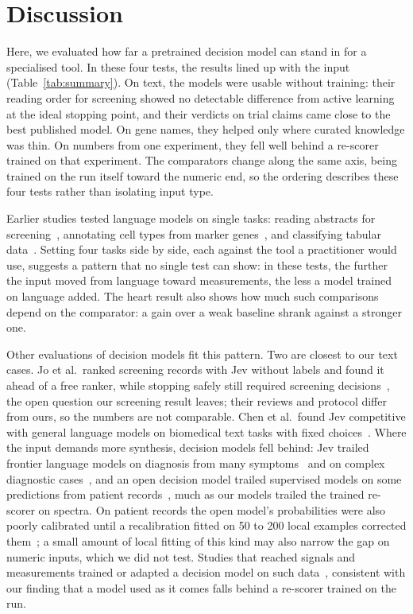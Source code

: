 \documentclass[10pt,twocolumn]{article}
\begin{document}
\section{Discussion}

Here, we evaluated how far a pretrained decision model can stand in for a specialised tool. In these four tests, the results lined up with the input (Table~\ref{tab:summary}). On text, the models were usable without training: their reading order for screening showed no detectable difference from active learning at the ideal stopping point, and their verdicts on trial claims came close to the best published model. On gene names, they helped only where curated knowledge was thin. On numbers from one experiment, they fell well behind a re-scorer trained on that experiment. The comparators change along the same axis, being trained on the run itself toward the numeric end, so the ordering describes these four tests rather than isolating input type.

Earlier studies tested language models on single tasks: reading abstracts for screening~\cite{guo2024}, annotating cell types from marker genes~\cite{gptcelltype}, and classifying tabular data~\cite{tabllm,hollmann}. Setting four tasks side by side, each against the tool a practitioner would use, suggests a pattern that no single test can show: in these tests, the further the input moved from language toward measurements, the less a model trained on language added. The heart result also shows how much such comparisons depend on the comparator: a gain over a weak baseline shrank against a stronger one.

Other evaluations of decision models fit this pattern. Two are closest to our text cases. Jo et al.\ ranked screening records with Jev without labels and found it ahead of a free ranker, while stopping safely still required screening decisions~\cite{jo2026}, the open question our screening result leaves; their reviews and protocol differ from ours, so the numbers are not comparable. Chen et al.\ found Jev competitive with general language models on biomedical text tasks with fixed choices~\cite{chen2026}. Where the input demands more synthesis, decision models fell behind: Jev trailed frontier language models on diagnosis from many symptoms~\cite{deobhakta2026} and on complex diagnostic cases~\cite{madrid2026}, and an open decision model trailed supervised models on some predictions from patient records~\cite{medjev}, much as our models trailed the trained re-scorer on spectra. On patient records the open model's probabilities were also poorly calibrated until a recalibration fitted on 50 to 200 local examples corrected them~\cite{medjev}; a small amount of local fitting of this kind may also narrow the gap on numeric inputs, which we did not test. Studies that reached signals and measurements trained or adapted a decision model on such data~\cite{eegjev,molrejev,s1pert,kevbio}, consistent with our finding that a model used as it comes falls behind a re-scorer trained on the run.
\end{document}
